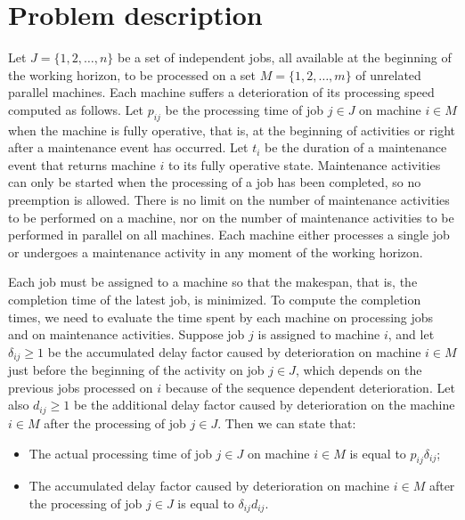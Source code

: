 \documentclass[a4paper,11pt]{article}
\begin{document}
\section{Problem description} \label{sec:problem}%
%
Let $J=\{1, 2, \dots, n\}$ be a set of independent jobs, all available at the beginning of the working horizon, to be processed on a set $M = \{1, 2, \dots, m\}$ of unrelated parallel machines. Each machine suffers a deterioration of its processing speed computed as follows. Let $p_{ij}$ be the processing time of job $j \in J$ on machine $i \in M$ when the machine is fully operative, that is, at the beginning of activities or right after a maintenance event has occurred. Let $t_i$ be the duration of a maintenance event that returns machine $i$ to its fully operative state. Maintenance activities can only be started when the processing of a job has been completed, so no preemption is allowed. There is no limit on the number of maintenance activities to be performed on a machine, nor on the number of maintenance activities to be performed in parallel on all machines. Each machine either processes a single job or undergoes a maintenance activity in any moment of the working horizon. 

Each job must be assigned to a machine so that the makespan, that is, the completion time of the latest job, is minimized. To compute the completion times, we need to evaluate the time spent by each machine on processing jobs and on maintenance activities. Suppose job $j$ is assigned to machine $i$, and let $\delta_{ij} \geq 1$ be the accumulated delay factor caused by deterioration on machine $i \in M$ just before the beginning of the activity on job $j \in J$, which depends on the previous jobs processed on $i$ because of the sequence dependent deterioration. Let also $d_{ij} \geq 1$ be the additional delay factor caused by deterioration on the machine $i \in M$ after the processing of job $j \in J$. Then we can state that:
\begin{itemize}
\item{ The actual processing time of job $j \in J$ on machine $i \in M$ is equal to $p_{ij} \delta_{ij}$;}
\item{ The accumulated delay factor caused by deterioration on machine $i \in M$ after the processing of job $j \in J$ is equal to $\delta_{ij} d_{ij}$.}
\end{itemize}
\end{document}
